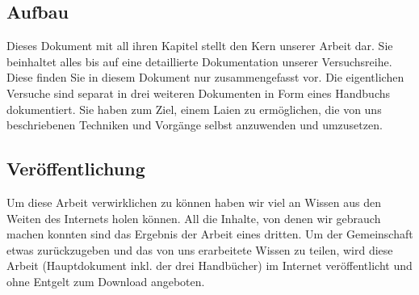 \subsection{Aufbau}
Dieses Dokument mit all ihren Kapitel stellt den Kern unserer Arbeit dar. Sie beinhaltet alles bis auf eine detaillierte Dokumentation unserer Versuchsreihe. Diese finden Sie in diesem Dokument nur zusammengefasst vor. Die eigentlichen Versuche sind separat in drei weiteren Dokumenten in Form eines Handbuchs dokumentiert. Sie haben zum Ziel, einem Laien zu ermöglichen, die von uns beschriebenen Techniken und Vorgänge selbst anzuwenden und umzusetzen. 

\subsection{Veröffentlichung}
Um diese Arbeit verwirklichen zu können haben wir viel an Wissen aus den Weiten des Internets holen können. All die Inhalte, von denen wir gebrauch machen konnten sind das Ergebnis der Arbeit eines dritten. Um der Gemeinschaft etwas zurückzugeben und das von uns erarbeitete Wissen zu teilen, wird diese Arbeit (Hauptdokument inkl. der drei Handbücher) im Internet veröffentlicht und ohne Entgelt zum Download angeboten. 